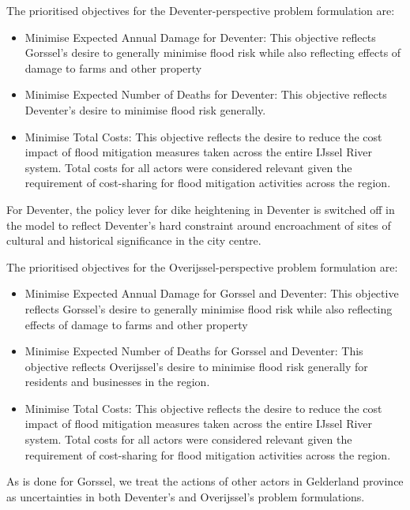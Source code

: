 \smallskip  

The prioritised objectives for the Deventer-perspective problem formulation are:
\begin{itemize}
    \item Minimise Expected Annual Damage for Deventer: This objective reflects Gorssel's desire to generally minimise flood risk while also reflecting effects of damage to farms and other property
    \item Minimise Expected Number of Deaths for Deventer: This objective reflects Deventer's desire to minimise flood risk generally.
    \item Minimise Total Costs: This objective reflects the desire to reduce the cost impact of flood mitigation measures taken across the entire IJssel River system. Total costs for all actors were considered relevant given the requirement of cost-sharing for flood mitigation activities across the region.
\end{itemize}
For Deventer, the policy lever for dike heightening in Deventer is switched off in the model to reflect Deventer's hard constraint around encroachment of sites of cultural and historical significance in the city centre.

The prioritised objectives for the Overijssel-perspective problem formulation are:
\begin{itemize}
    \item Minimise Expected Annual Damage for Gorssel and Deventer: This objective reflects Gorssel's desire to generally minimise flood risk while also reflecting effects of damage to farms and other property
    \item Minimise Expected Number of Deaths for Gorssel and Deventer: This objective reflects Overijssel's desire to minimise flood risk generally for residents and businesses in the region.
    \item Minimise Total Costs: This objective reflects the desire to reduce the cost impact of flood mitigation measures taken across the entire IJssel River system. Total costs for all actors were considered relevant given the requirement of cost-sharing for flood mitigation activities across the region.
\end{itemize}

As is done for Gorssel, we treat the actions of other actors in Gelderland province as uncertainties in both Deventer's and Overijssel's problem formulations.